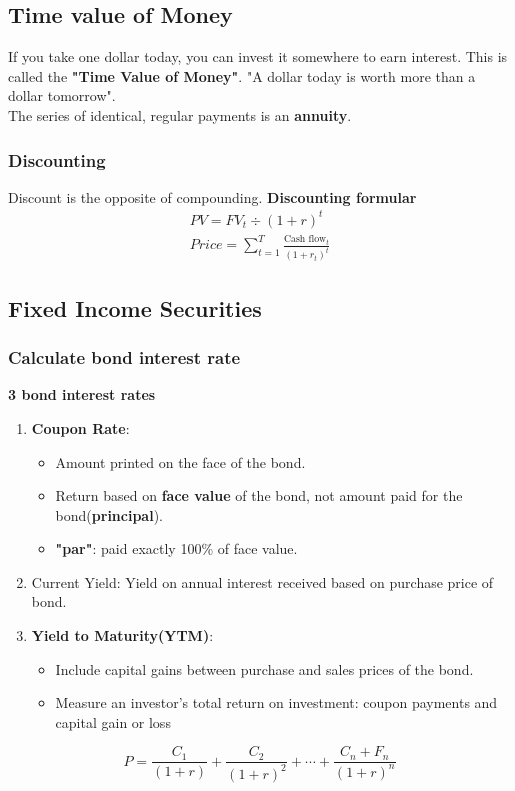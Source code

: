 \documentclass{article}
\theoremstyle{definition}
\theoremstyle{thrm}
\theoremstyle{lma}
\theoremstyle{ppst}
\theoremstyle{crlr}
\begin{document}
\subsection{Time value of Money}
If you take one dollar today, you can invest it somewhere to earn interest. This is called the \textbf{"Time Value of Money"}. "A dollar today is worth more than a dollar tomorrow".\\
The series of identical, regular payments is an \textbf{annuity}.
\subsubsection{Discounting}
Discount is the opposite of compounding.
\textbf{Discounting formular}
\begin{align*}
	PV = FV_t \div (1+r)^t \\
	Price = \sum_{t=1}^T\frac{\text{Cash flow}_t}{(1+r_t)^t}
\end{align*}
\subsection{Fixed Income Securities}
\subsubsection{Calculate bond interest rate}
\textbf{3 bond interest rates}
\begin{enumerate}
	\item \textbf{Coupon Rate}:
	\begin{itemize}
		\item Amount printed on the face of the bond. 
		\item Return based on \textbf{face value} of the bond, not amount paid for the bond(\textbf{principal}).
		\item \textbf{"par"}: paid exactly 100\% of face value. 
	\end{itemize}	
	\item Current Yield: Yield  on annual interest received based on purchase price of bond.
	\item \textbf{Yield to Maturity(YTM)}:
	\begin{itemize}
		\item Include capital gains between purchase and sales prices of the bond.
		\item Measure an investor's total return on investment: coupon payments and capital gain or loss
	\end{itemize}
\end{enumerate}
\begin{equation*}
	P = \frac{C_1}{(1+r)}+\frac{C_2}{(1+r)^2}+\cdots+\frac{C_n+F_n}{(1+r)^n}
\end{equation*}
\end{document}
